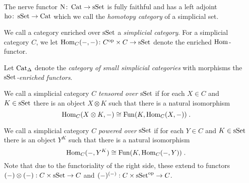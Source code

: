\begin{lemma}\label{lem:nerveFF}
    The nerve functor $\operatorname{N}\colon\operatorname{Cat}\to\operatorname{sSet}$ is fully faithful and has a left adjoint $\operatorname{ho}\colon\operatorname{sSet}\to\operatorname{Cat}$ which we call the \emph{homotopy category} of a simplicial set.
    \begin{reference}
        \cite[Proposition 1.2.2.1]{kerodon}
    \end{reference}
\end{lemma}
\begin{definition}
    We call a category enriched over $\operatorname{sSet}$ a \emph{simplicial category}.
    For a simplicial category $C$, we let $\operatorname{Hom}_C(-,-)\colon C^{\operatorname{op}}\times C\to\operatorname{sSet}$ denote the enriched $\operatorname{Hom}$-functor.
   
    Let $\operatorname{Cat}_{\Delta}$ denote the \emph{category of small simplicial categories} with morphisms the \emph{$\operatorname{sSet}$-enriched functors}.%
    
    We call a simplicial category $C$ \emph{tensored over $\operatorname{sSet}$} if for each $X\in C$ and $K\in\operatorname{sSet}$ there is an object $X\otimes K$ such that there is a natural isomorphism
    \begin{equation*}
        \operatorname{Hom}_C(X\otimes K,-)\cong\operatorname{Fun}(K,\operatorname{Hom}_C(X,-))\;.
    \end{equation*}

    We call a simplicial category $C$ \emph{powered over $\operatorname{sSet}$} if for each $Y\in C$ and $K\in\operatorname{sSet}$ there is an object $Y^K$ such that there is a natural isomorphism
    \begin{equation*}
        \operatorname{Hom}_C(-,Y^K)\cong\operatorname{Fun}(K,\operatorname{Hom}_C(-,Y))\;.
    \end{equation*}
    Note that due to the functoriality of the right side, these extend to functors $(-)\otimes(-):C\times\operatorname{sSet}\to C$ and $(-)^{(-)}:C\times\operatorname{sSet}^{\operatorname{op}}\to C$.
\end{definition}
